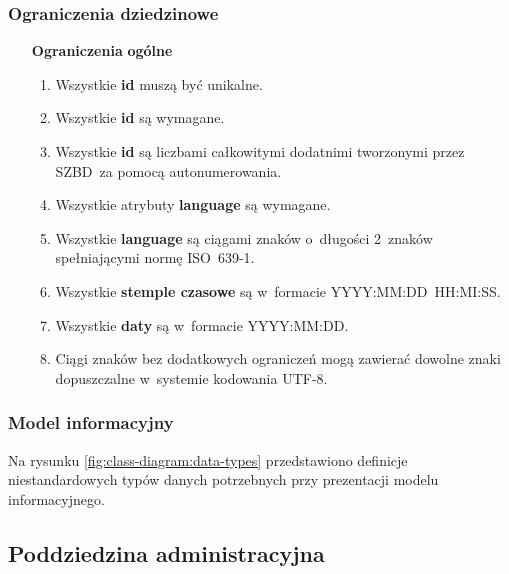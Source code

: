 \subsubsection{Ograniczenia dziedzinowe}\label{subsubsec:database:domain:restrictions}

\begin{itemize}[label={\textbf{Ograniczenia dla}}, wide, labelwidth=!, labelindent=0pt]
    \setlength\itemsep{1.75em}
    \item[\textbf{Ograniczenia}] \textbf{ogólne}
    \begin{enumerate}[label={\textbf{OGR/0/\protect\twodigits{\arabic{enumi}}}}, wide, labelwidth=!, align=left, leftmargin=3cm]
        \item Wszystkie \textbf{id} muszą być unikalne.
        \item Wszystkie \textbf{id} są wymagane.
        \item Wszystkie \textbf{id} są liczbami całkowitymi dodatnimi tworzonymi przez SZBD~za pomocą autonumerowania.
        \item Wszystkie atrybuty \textbf{language} są wymagane.
        \item Wszystkie \textbf{language} są ciągami znaków o~długości 2~znaków spełniającymi normę ISO~639-1.
        \item Wszystkie \textbf{stemple czasowe} są w~formacie YYYY:MM:DD~HH:MI:SS.
        \item Wszystkie \textbf{daty} są w~formacie YYYY:MM:DD.
        \item Ciągi znaków bez dodatkowych ograniczeń mogą zawierać dowolne znaki dopuszczalne w~systemie kodowania UTF-8.
    \end{enumerate}
\end{itemize}

\subsubsection{Model informacyjny}\label{subsubsec:database:domain:domainModel}
Na rysunku \ref{fig:class-diagram:data-types} przedstawiono definicje niestandardowych typów danych potrzebnych przy prezentacji modelu informacyjnego.


\pagebreak
\subsection{Poddziedzina administracyjna}\label{subsec:database:gateway}


